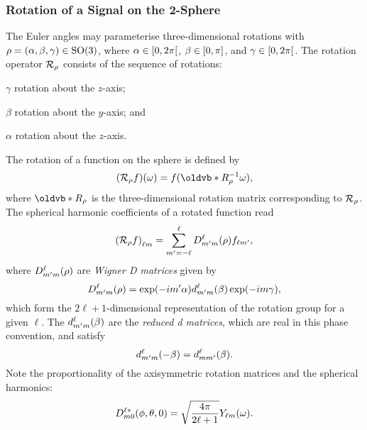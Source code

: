 \subsubsection{Rotation of a Signal on the 2-Sphere}

The Euler angles may parameterise three-dimensional rotations with \(\rho = (\alpha,\beta,\gamma) \in \rotationGroup{}\), where \(\alpha \in \interval[open right]{0}{2\pi}\), \(\beta \in \interval{0}{\pi}\), and \(\gamma \in \interval[open right]{0}{2\pi}\).
The rotation operator \(\rotation{\rho}\) consists of the sequence of rotations:
%
\begin{inparaenum}[(i)]
	\item \({\gamma}\) rotation about the \(z\)-axis;
	\item \({\beta}\) rotation about the \(y\)-axis; and
	\item \({\alpha}\) rotation about the \(z\)-axis.
\end{inparaenum}
%
The rotation of a function on the sphere is defined by
%
\begin{equation}
	\pixel{(\rotation{\rho}f)}
	= f(\vb{R}_{\rho}^{-1} \omega),
\end{equation}
%
where \(\vb{R}_{\rho}\) is the three-dimensional rotation matrix corresponding to \(\rotation{\rho}\).
The spherical harmonic coefficients of a rotated function read
%
\begin{equation}\label{eq:chapter2_rotation_matrix}
	\harmonic{(\rotation{\rho}f)}
	= \sum\limits_{m'=-\ell}^{\ell} \wigner{\ell}{m'}{m}(\rho) f_{\ell m'},
\end{equation}
%
where \(\wigner{\ell}{m'}{m}(\rho)\) are \emph{Wigner D matrices} given by
%
\begin{equation}\label{eq:chapter2_reduced_wigner_define}
	\wigner{\ell}{m'}{m}(\rho)
	= \exp(-i m'\alpha) \reducedWigner{\ell}{m'}{m}(\beta) \exp(-i m\gamma),
\end{equation}
%
which form the \(2\ell+1\)-dimensional representation of the rotation group for a given \({\ell}\).
The \(\reducedWigner{\ell}{m'}{m}(\beta)\) are the \emph{reduced d matrices}, which are real in this phase convention, and satisfy
%
\begin{equation}\label{eq:chapter2_reduced_wigner_symmetry}
	\reducedWigner{\ell}{m'}{m}(-\beta)
	= \reducedWigner{\ell}{m}{m'}(\beta).
\end{equation}
%
Note the proportionality of the axisymmetric rotation matrices and the spherical harmonics:
%
\begin{equation}\label{eq:chapter2_wigner_axisymmetric}
	\wigner[\ast]{\ell}{m}{0}(\phi,\theta,0)
	= \sqrt{\inverseFactor} \pixel{\harmonic{Y}}.
\end{equation}

